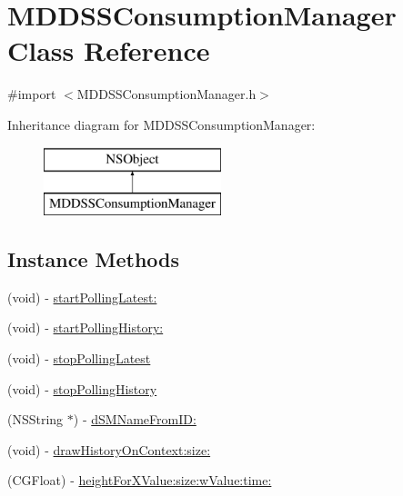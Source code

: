 \hypertarget{interface_m_d_d_s_s_consumption_manager}{\section{M\-D\-D\-S\-S\-Consumption\-Manager Class Reference}
\label{interface_m_d_d_s_s_consumption_manager}
}


{\ttfamily \#import $<$M\-D\-D\-S\-S\-Consumption\-Manager.\-h$>$}

Inheritance diagram for M\-D\-D\-S\-S\-Consumption\-Manager\-:\begin{figure}[H]
\begin{center}
\leavevmode
\includegraphics[height=2.000000cm]{interface_m_d_d_s_s_consumption_manager}
\end{center}
\end{figure}
\subsection*{Instance Methods}
\begin{DoxyCompactItemize}
\item 
(void) -\/ \hyperlink{interface_m_d_d_s_s_consumption_manager_aacfaedb3584a13fbeda5f2cf67223ce8}{start\-Polling\-Latest\-:}
\item 
(void) -\/ \hyperlink{interface_m_d_d_s_s_consumption_manager_a9a21d799de7fc9069558a53c73cdfb9c}{start\-Polling\-History\-:}
\item 
(void) -\/ \hyperlink{interface_m_d_d_s_s_consumption_manager_af253ad6e5f08008ceec0a247a27b2526}{stop\-Polling\-Latest}
\item 
(void) -\/ \hyperlink{interface_m_d_d_s_s_consumption_manager_a5c9bf787dd26bf05d1185cf06412ba32}{stop\-Polling\-History}
\item 
(N\-S\-String $\ast$) -\/ \hyperlink{interface_m_d_d_s_s_consumption_manager_a4347a6f14215e842e5629072c1a883c4}{d\-S\-M\-Name\-From\-I\-D\-:}
\item 
(void) -\/ \hyperlink{interface_m_d_d_s_s_consumption_manager_ac4d5086c7cf8ce63e8e3996ba5e841ea}{draw\-History\-On\-Context\-:size\-:}
\item 
(C\-G\-Float) -\/ \hyperlink{interface_m_d_d_s_s_consumption_manager_a4df48a1a45fa35b89206c129fdcda839}{height\-For\-X\-Value\-:size\-:w\-Value\-:time\-:}
\end{DoxyCompactItemize}
